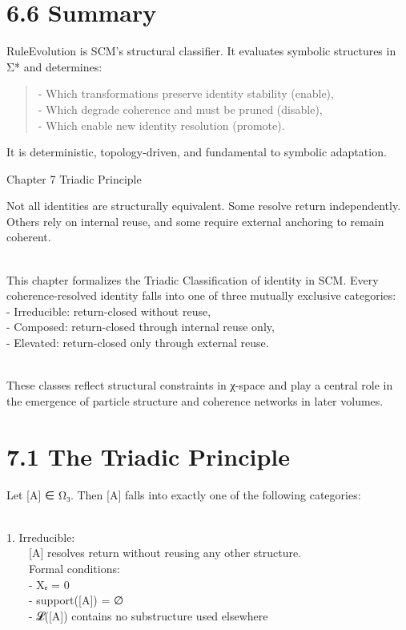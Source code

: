 \section{6.6 \textbar{} Summary}\label{summary-4}

RuleEvolution is SCM's structural classifier. It evaluates symbolic
structures in Σ* and determines:

\begin{quote}
- Which transformations preserve identity stability (enable),\\
- Which degrade coherence and must be pruned (disable),\\
- Which enable new identity resolution (promote).
\end{quote}

It is deterministic, topology-driven, and fundamental to symbolic
adaptation.

Chapter 7 \textbar{} Triadic Principle

Not all identities are structurally equivalent. Some resolve return
independently. Others rely on internal reuse, and some require external
anchoring to remain coherent.\\
\strut \\
This chapter formalizes the Triadic Classification of identity in SCM.
Every coherence-resolved identity falls into one of three mutually
exclusive categories:\\
- Irreducible: return-closed without reuse,\\
- Composed: return-closed through internal reuse only,\\
- Elevated: return-closed only through external reuse.\\
\strut \\
These classes reflect structural constraints in χ-space and play a
central role in the emergence of particle structure and coherence
networks in later volumes.

\section{7.1 \textbar{} The Triadic
Principle}\label{the-triadic-principle}

Let {[}A{]} ∈ Ω₃. Then {[}A{]} falls into exactly one of the following
categories:\\
\strut \\
1. Irreducible:\\
  {[}A{]} resolves return without reusing any other structure.\\
  Formal conditions:\\
  - Xₑ = 0\\
  - support({[}A{]}) = ∅\\
  - 𝓛({[}A{]}) contains no substructure used elsewhere

